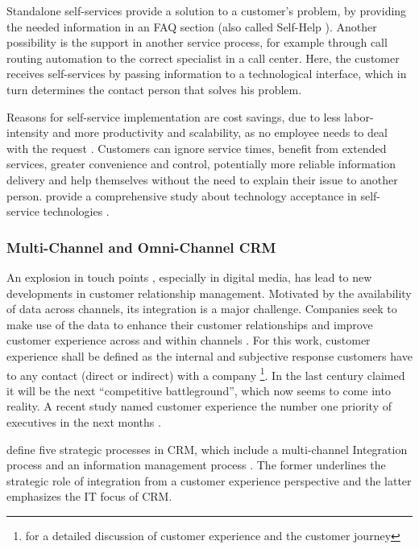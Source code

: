 		Standalone self-services provide a solution to a customer's problem, \ie by providing the needed information in an \acrshort{FAQ} section (also called Self-Help \citep{meuter2000self}). Another possibility is the support in another service process, for example through call routing automation to the correct specialist in a call center. Here, the customer receives self-services by passing information to a technological interface, which in turn determines the contact person that solves his problem.  
		
		Reasons for self-service implementation are cost savings, due to less labor-intensity and more productivity and scalability, as no employee needs to deal with the request \citep{Walker_2002, Walker_2003}. Customers can ignore service times, benefit from extended services, greater convenience and control, potentially more reliable information delivery and help themselves without the need to explain their issue to another person. \citeauthor{Blut_2016} provide a comprehensive study about technology acceptance in self-service technologies \citep{Blut_2016}. 
		
	\subsubsection{Multi-Channel and Omni-Channel CRM}
		An explosion in touch points \citep{Lemon_2016}, especially in digital media, has lead to new developments in customer relationship management. Motivated by the availability of data across channels, its integration is a major challenge. Companies seek to make use of the data to enhance their customer relationships and improve customer experience across and within channels \citep{Frow_2007}. For this work, customer experience shall be defined as the internal and subjective response customers have to any contact (direct or indirect) with a company \citep{meyer2007customer}\footnote{\cf \cite{Lemon_2016} for a detailed discussion of customer experience and the customer journey }. In the last century \citeauthor{gilmore1998} claimed it will be the next \enquote{competitive battleground}, which now seems to come into reality. A recent study named customer experience the number one priority of executives in the next months \citep{acc2015ce}.
		
		\citeauthor{payne2004role} define five strategic processes in \acrshort{CRM}, which include a multi-channel Integration process and an information management process \citep{payne2004role}. The former underlines the strategic role of integration from a customer experience perspective and the latter emphasizes the IT focus of CRM. 
		
